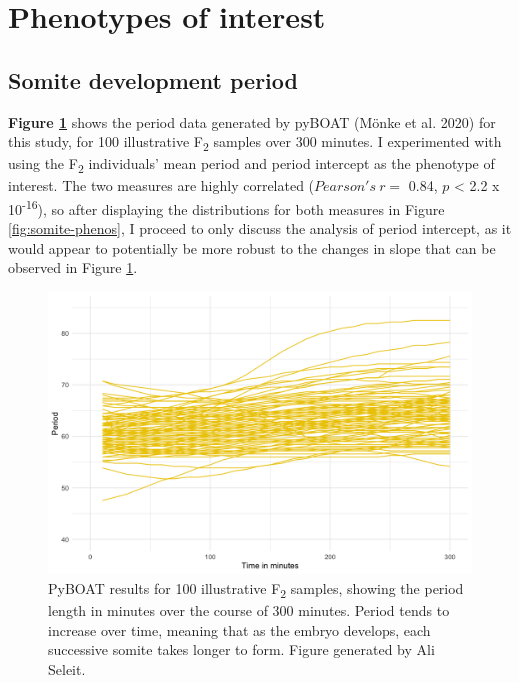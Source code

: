 \documentclass[
]{book}
\begin{document}
\hypertarget{somite-phenotype}{%
\section{Phenotypes of interest}\label{somite-phenotype}}

\hypertarget{somite-development-period}{%
\subsection{Somite development period}\label{somite-development-period}}

\textbf{Figure \ref{fig:ali-somite-period-lines}} shows the period data generated by pyBOAT (Mönke et al. 2020) for this study, for 100 illustrative F\textsubscript{2} samples over 300 minutes. I experimented with using the F\textsubscript{2} individuals' mean period and period intercept as the phenotype of interest. The two measures are highly correlated (\(Pearson's~r =\) 0.84, \(p\) \textless{} 2.2 x 10\textsuperscript{-16}), so after displaying the distributions for both measures in Figure \ref{fig:somite-phenos}, I proceed to only discuss the analysis of period intercept, as it would appear to potentially be more robust to the changes in slope that can be observed in Figure \ref{fig:ali-somite-period-lines}.



\begin{figure}
\includegraphics[width=1\linewidth]{figs/somites/ali_period_lines_100fish300mins} \caption{PyBOAT results for 100 illustrative F\textsubscript{2} samples, showing the period length in minutes over the course of 300 minutes. Period tends to increase over time, meaning that as the embryo develops, each successive somite takes longer to form. Figure generated by Ali Seleit.}\label{fig:ali-somite-period-lines}
\end{figure}
\end{document}
